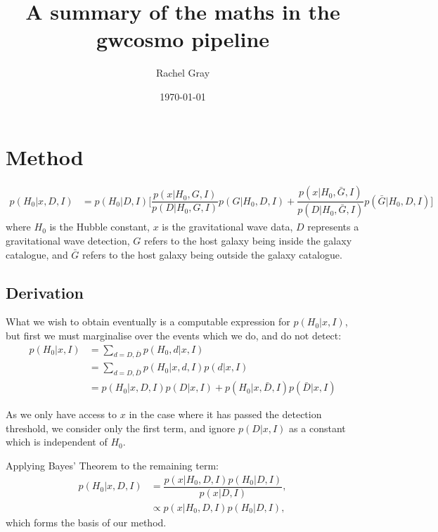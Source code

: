 \documentclass[a4paper,10pt]{article}
\title{A summary of the maths in the gwcosmo pipeline}
\author{Rachel Gray}
\date{\today} %
\begin{document}
\maketitle

\section{Method}
\begin{equation} \label{Eq:Master Equation}
\begin{aligned}
p(H_0|x,D,I) &= p(H_0|D,I) \bigg[ \dfrac{p(x|H_0,G,I)}{p(D|H_0,G,I)} p(G|H_0,D,I) + \dfrac{p(x|H_0,\bar{G},I)}{p(D|H_0,\bar{G},I)} p(\bar{G}|H_0,D,I) \bigg]
\end{aligned}
\end{equation}
where $H_0$ is the Hubble constant, $x$ is the gravitational wave data, $D$ represents a gravitational wave detection, $G$ refers to the host galaxy being inside the galaxy catalogue, and $\bar{G}$ refers to the host galaxy being outside the galaxy catalogue.

\subsection{Derivation}
What we wish to obtain eventually is a computable expression for $p(H_0|x,I)$, but first we must marginalise over the events which we do, and do not detect:
\begin{equation} \label{Eq:sum D}
\begin{aligned}
p(H_0|x,I) &= \sum_{d=D,\bar{D}} p(H_0,d|x,I)
\\ &= \sum_{d=D,\bar{D}} p(H_0|x,d,I) p(d|x,I)
\\ &= p(H_0|x,D,I) p(D|x,I) + p(H_0|x,\bar{D},I) p(\bar{D}|x,I)
\end{aligned} 
\end{equation}

As we only have access to $x$ in the case where it has passed the detection threshold, we consider only the first term, and ignore $p(D|x,I)$ as a constant which is independent of $H_0$.

Applying Bayes' Theorem to the remaining term:
\begin{equation} \label{Eq:posterior}
\begin{aligned}
p(H_0|x,D,I) &= \dfrac{p(x|H_0,D,I)p(H_0|D,I)}{p(x|D,I)},
\\ &\propto p(x|H_0,D,I)p(H_0|D,I),
\end{aligned} 
\end{equation}
which forms the basis of our method.
\end{document}
